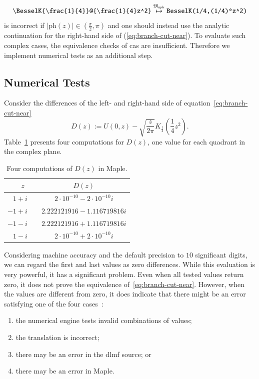 \documentclass[a4paper,11pt]{article}
\newcommand{\Maple}{Maple}
\newcommand{\langMaple}{\mathfrak{M}_{aple}}
\newcommand{\tableRowSpace}{\rule{0pt}{0.9\normalbaselineskip}}
\theoremstyle{defTheoStyle}
\theoremstyle{defExampStyle}
\DeclareRobustCommand{\cpi}{{\pi}}
\DeclareRobustCommand{\iunit}{{i}}
\newcommand{\ph}[1]{\mathrm{ph}\!\left(#1\right)}
\begin{document}
\begin{equation}
\verb|\BesselK{\frac{1}{4}}@{\frac{1}{4}z^2}| \overset{\langMaple}{\mapsto} \verb|BesselK(1/4,(1/4)*z^2)|
\end{equation}
is incorrect if $|\ph{z}| \in \left(\frac{\cpi}{2}, \cpi\right)$ and one should instead use the analytic continuation for the right-hand side of (\ref{eq:branch-cut-near}). 
To evaluate such complex cases, the equivalence checks of \gls*{cas} are insufficient. Therefore we implement numerical tests as an additional step.

\subsection{Numerical Tests}\label{sec:numerical-tests}
Consider the differences of the left- and right-hand side of equation~\eqref{eq:branch-cut-near}
\begin{equation}\label{eq:difference}
D(z) := U(0,z) - \sqrt{\frac{z}{2\cpi}} K_{\frac{1}{4}}\left(\frac{1}{4}z^2\right).
\end{equation}
Table~\ref{tab:computations-for-difference} presents four computations for $D(z)$, one value for each quadrant in the complex plane.
\begin{table}[ht]
\centering
\begin{tabular}{rcc}
	\hline
	$z\ \ $ & & $D(z)$\\
	\hline
	\tableRowSpace{} $1+\iunit$ & & $2 \cdot 10^{-10} - 2 \cdot 10^{-10} \iunit$\\
	$-1+\iunit$& & $2.222121916 - 1.116719816 \iunit$\\
	$-1-\iunit$& & $2.222121916 + 1.116719816 \iunit$\\
	$1-\iunit$ & & $2 \cdot 10^{-10} + 2 \cdot 10^{-10} \iunit$\\
	\hline
\end{tabular}
\caption{Four computations of $D(z)$ in \Maple.}
\label{tab:computations-for-difference}
\end{table}

Considering machine accuracy and the default precision to $10$ significant digits, we can regard the first and last values as zero differences. While this evaluation is very powerful, it has a significant problem. Even when all tested values return zero, it does not prove the equivalence of~\eqref{eq:branch-cut-near}. However, when the values are different from zero, it does indicate that there might be an error satisfying one of the four cases~\parencite{NumericalTests:Paper}:
\begin{enumerate}
\item the numerical engine tests invalid combinations of values;
\item the translation is incorrect;
\item there may be an error in the \gls*{dlmf} source; or
\item there may be an error in \Maple.
\end{enumerate}
\end{document}
